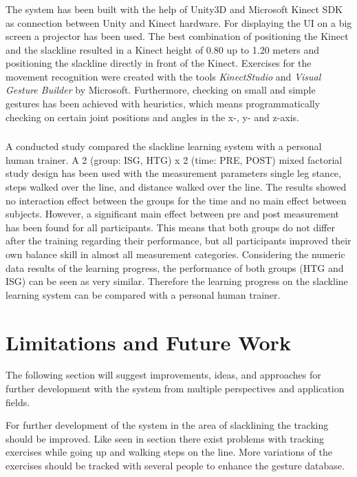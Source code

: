 \subsubsection{}
The system has been built with the help of Unity3D and Microsoft Kinect SDK as connection between Unity and Kinect hardware.
For displaying the UI on a  big screen a projector has been used.
The best combination of positioning the Kinect and the slackline resulted in a Kinect height of 0.80 up to 1.20 meters and positioning the slackline directly in front of the Kinect.
Exercises for the movement recognition were created with the tools \textit{KinectStudio} and \textit{Visual Gesture Builder} by Microsoft.
Furthermore, checking on small and simple gestures has been achieved with heuristics, which means programmatically checking on certain joint positions and angles in the x-, y- and z-axis.

\subsubsection{}
A conducted study compared the slackline learning system with a personal human trainer.
A 2 (group: ISG, HTG) x 2 (time: PRE, POST) mixed factorial study design has been used with the measurement parameters single leg stance, steps walked over the line, and distance walked over the line.
The results showed no interaction effect between the groups for the time and no main effect between subjects.
However, a significant main effect between pre and post measurement has been found for all participants.
This means that both groups do not differ after the training regarding their performance, but all participants improved their own balance skill in almost all measurement categories.
Considering the numeric data results of the learning progress, the performance of both groups (HTG and ISG) can be seen as very similar.
Therefore the learning progress on the slackline learning system can be compared with a personal human trainer.

\section{Limitations and Future Work}
The following section will suggest improvements, ideas, and approaches for further development with the system from multiple perspectives and application fields.

For further development of the system in the area of slacklining the tracking should be improved.
Like seen in section \textit{} there exist problems with tracking exercises while going up and walking steps on the line.
More variations of the exercises should be tracked with several people to enhance the gesture database.

